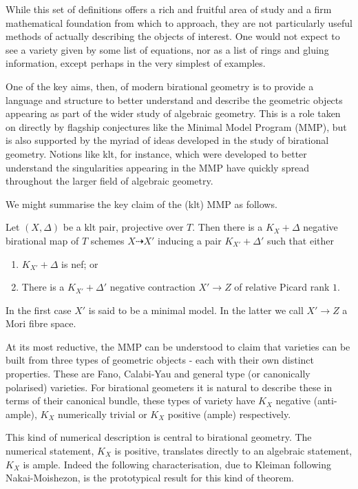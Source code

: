 \documentclass[a4paper,12pt]{book}
\begin{document}
	While this set of definitions offers a rich and fruitful area of study and a firm mathematical foundation from which to approach, they are not particularly useful methods of actually describing the objects of interest. One would not expect to see a variety given by some list of equations, nor as a list of rings and gluing information, except perhaps in the very simplest of examples.
	
	One of the key aims, then, of modern birational geometry is to provide a language and structure to better understand and describe the geometric objects appearing as part of the wider study of algebraic geometry. This is a role taken on directly by flagship conjectures like the Minimal Model Program (MMP), but is also supported by the myriad of ideas developed in the study of birational geometry. Notions like klt, for instance, which were developed to better understand the singularities appearing in the MMP have quickly spread throughout the larger field of algebraic geometry.
	
	We might summarise the key claim of the (klt) MMP as follows.
	
	\begin{conjecture*}
		Let $(X,\Delta)$ be a klt pair, projective over $T$. Then there is a $K_{X}+\Delta$ negative birational map of $T$ schemes $X \dashrightarrow X'$ inducing a pair $K_{X'}+\Delta'$ such that either
		
		\begin{enumerate}
			\item $K_{X'}+\Delta$ is nef; or
			\item There is a $K_{X'}+\Delta'$ negative contraction $X' \to Z$ of relative Picard rank $1$.
		\end{enumerate}
	\end{conjecture*}
	
	In the first case $X'$ is said to be a minimal model. In the latter we call $X' \to Z$ a Mori fibre space.
	
	At its most reductive, the MMP can be understood to claim that varieties can be built from three types of geometric objects - each with their own distinct properties. These are Fano, Calabi-Yau and general type (or canonically polarised) varieties. For birational geometers it is natural to describe these in terms of their canonical bundle, these types of variety have $K_{X}$ negative (anti-ample), $K_{X}$ numerically trivial or $K_{X}$ positive (ample) respectively.
	
	This kind of numerical description is central to birational geometry. The numerical statement, $K_{X}$ is positive, translates directly to an algebraic statement, $K_{X}$ is ample. Indeed the following characterisation, due to Kleiman following Nakai-Moishezon,  is the prototypical result for this kind of theorem.
	
\end{document}
